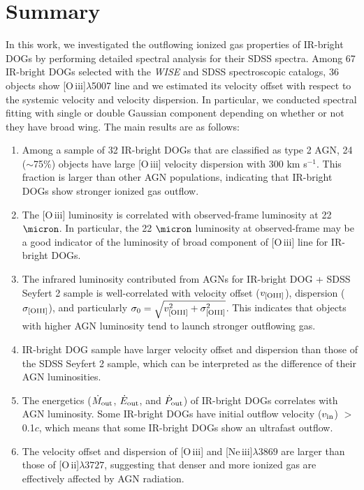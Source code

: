 \documentclass[twocolumn]{aastex6}
\newcommand{\oiii}{[O{\,\sc iii}]\,\,}
\begin{document}
\section{Summary}
\label{Sum}
In this work, we investigated the outflowing ionized gas properties of IR-bright DOGs by performing  detailed spectral analysis for their SDSS spectra.
Among 67 IR-bright DOGs selected with the {\it WISE} and SDSS spectroscopic catalogs, 36 objects show [O{\,\sc iii}]$\lambda$5007 line and we estimated its velocity offset with respect to the systemic velocity and velocity dispersion.
In particular, we conducted spectral fitting with single or double Gaussian component depending on whether or not they have broad wing.
The main results are as follows:
\begin{enumerate}
\item Among a sample of 32 IR-bright DOGs that are classified as type 2 AGN, 24 ($\sim$75\%) objects have large \oiii velocity dispersion with 300 km s$^{-1}$. This fraction is larger than other AGN populations, indicating that IR-bright DOGs show stronger ionized gas outflow.
\item The \oiii luminosity is correlated with observed-frame luminosity at 22 $\micron$. In particular, the 22 $\micron$ luminosity at observed-frame may be a good indicator of the luminosity of broad component of \oiii line for IR-bright DOGs.
\item The infrared luminosity contributed from AGNs for IR-bright DOG + SDSS Seyfert 2 sample is well-correlated with velocity offset ($v_{\rm [OIII]}$), dispersion ($\sigma_{\rm [OIII]}$), and particularly $\sigma_0 = \sqrt{v_{\rm [OIII]}^2 + \sigma_{\rm [OIII]}^2}$.
This indicates that objects with higher AGN luminosity tend to launch stronger outflowing gas.
\item IR-bright DOG sample have larger velocity offset and dispersion than those of the SDSS Seyfert 2 sample, which can be interpreted as the difference of their AGN luminosities.
\item The energetics ($\dot{M}_{\rm out}$, $\dot{E}_{\rm out}$, and $\dot{P}_{\rm out}$) of IR-bright DOGs correlates with AGN luminosity. 
Some IR-bright DOGs have initial outflow velocity ($v_{\rm in}$) $>$ 0.1$c$, which means that some IR-bright DOGs show an ultrafast outflow.
\item The velocity offset and dispersion of \oiii and [Ne{\,\sc iii}]$\lambda3869$ are larger than those of [O{\,\sc ii}]$\lambda3727$, suggesting that denser and more ionized gas are effectively affected by AGN radiation.
\end{enumerate}
\end{document}
